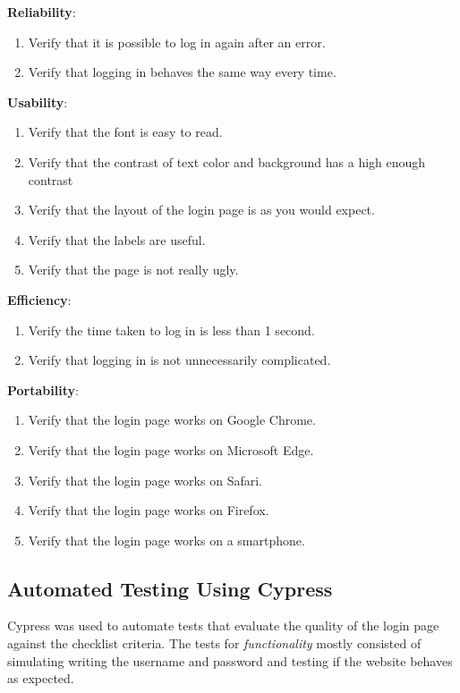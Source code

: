 \documentclass[journal,twocolumn]{IEEEtran}
\begin{document}
\textbf{Reliability}:

\begin{enumerate}[label=2.\arabic*]
    \item Verify that it is possible to log in again after an error.
    \item Verify that logging in behaves the same way every time.
\end{enumerate}

\textbf{Usability}:

\begin{enumerate}[label=3.\arabic*]
    \item Verify that the font is easy to read.
    \item Verify that the contrast of text color and background has a high enough contrast
    \item Verify that the layout of the login page is as you would expect.
    \item Verify that the labels are useful.
    \item Verify that the page is not really ugly.
\end{enumerate}

\textbf{Efficiency}:

\begin{enumerate}[label=4.\arabic*]
    \item Verify the time taken to log in is less than 1 second.
    \item Verify that logging in is not unnecessarily complicated.
\end{enumerate}

\textbf{Portability}:
\begin{enumerate}[label=5.\arabic*]
    \item Verify that the login page works on Google Chrome.
    \item Verify that the login page works on Microsoft Edge.
    \item Verify that the login page works on Safari.
    \item Verify that the login page works on Firefox.
    \item Verify that the login page works on a smartphone.
\end{enumerate}

\subsection{Automated Testing Using Cypress}
Cypress was used to automate tests that evaluate the quality of the login page against the checklist criteria. The tests for \textit{functionality} mostly consisted of simulating writing the username and password and testing if the website behaves as expected.
\end{document}
